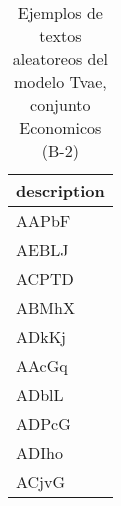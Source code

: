 \begin{table}[H]
\centering
\fontsize{8}{14}\selectfont
\caption{Ejemplos de textos aleatoreos del modelo Tvae, conjunto Economicos (B-2)}
\label{table-sample10-economicos-b-2-tvae-text}
\begin{tabular}{|m{50em}|}
\hline
\rowcolor[gray]{0.8}
description \\
\hline AAPbF \\
\hline AEBLJ \\
\hline ACPTD \\
\hline ABMhX \\
\hline ADkKj \\
\hline AAcGq \\
\hline ADblL \\
\hline ADPcG \\
\hline ADIho \\
\hline ACjvG \\
\hline
\end{tabular}
\end{table}
